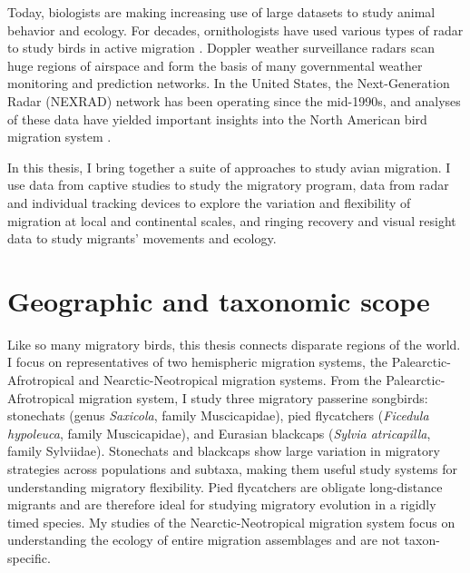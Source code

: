 \documentclass[a4paper, nobind]{templates/ociamthesis}
\begin{document}
Today, biologists are making increasing use of large datasets to study animal behavior and ecology. For decades, ornithologists have used various types of radar to study birds in active migration \autocite{gauthreauxRadarOrnithologyBiological2003}. Doppler weather surveillance radars scan huge regions of airspace and form the basis of many governmental weather monitoring and prediction networks. In the United States, the Next-Generation Radar (NEXRAD) network has been operating since the mid-1990s, and analyses of these data have yielded important insights into the North American bird migration system \autocite{gauthreauxRadarOrnithologyBiological2003,farnsworthCharacterizationAutumnNocturnal2016,dokterSeasonalAbundanceSurvival2018}.

In this thesis, I bring together a suite of approaches to study avian migration. I use data from captive studies to study the migratory program, data from radar and individual tracking devices to explore the variation and flexibility of migration at local and continental scales, and ringing recovery and visual resight data to study migrants' movements and ecology.

\hypertarget{geographic-and-taxonomic-scope}{%
\section*{Geographic and taxonomic scope}\label{geographic-and-taxonomic-scope}}

Like so many migratory birds, this thesis connects disparate regions of the world. I focus on representatives of two hemispheric migration systems, the Palearctic-Afrotropical and Nearctic-Neotropical migration systems. From the Palearctic-Afrotropical migration system, I study three migratory passerine songbirds: stonechats (genus \emph{Saxicola}, family Muscicapidae), pied flycatchers (\emph{Ficedula hypoleuca}, family Muscicapidae), and Eurasian blackcaps (\emph{Sylvia atricapilla}, family Sylviidae). Stonechats and blackcaps show large variation in migratory strategies across populations and subtaxa, making them useful study systems for understanding migratory flexibility. Pied flycatchers are obligate long-distance migrants and are therefore ideal for studying migratory evolution in a rigidly timed species. My studies of the Nearctic-Neotropical migration system focus on understanding the ecology of entire migration assemblages and are not taxon-specific.
\end{document}
